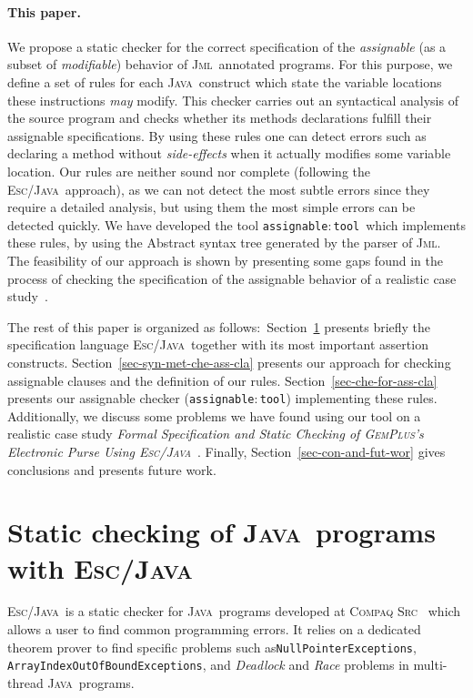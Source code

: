 \documentclass[a4paper]{llncs}
\newcommand{\jml}{\textsc{Jml}}
\newcommand{\escj}{\textsc{Esc/Java}}
\newcommand{\java}{\textsc{Java}}
\newcommand{\gplus}{\textsc{GemPlus}}
\newcommand{\csrc}{\textsc{Compaq Src}}
\newcommand{\modtool}{\texttt{assignable$:$tool}}
\begin{document}
\paragraph{\bf This paper.}We propose a static checker for the correct
specification of the
\emph{assignable} (as a subset of \emph{modifiable}) behavior of
\jml~annotated programs. For this purpose, we define a set
of rules for each \java~construct which state the variable locations
these instructions \emph{may} modify. This checker carries out an
syntactical analysis of the source program and checks whether its
methods declarations fulfill their assignable specifications. By using
these rules one can detect errors such as
declaring a method without \emph{side-effects} when it actually modifies 
some variable location. Our rules are neither sound nor complete
(following the \escj~approach), as we can not detect the most subtle
errors since they require a detailed analysis, but using them the
most simple errors can be detected quickly. We have developed the tool
\modtool~which implements these rules, by using the Abstract syntax
tree generated by the parser of \jml. The feasibility of our approach is
shown by presenting some gaps found in the process of checking the
specification of the
assignable behavior of a realistic case study~\cite{CatanoH02a}.


The rest of this paper is organized as follows$:$
Section~\ref{sec-esc-prg} presents briefly the specification language
\escj~together with its most important assertion
constructs. Section~\ref{sec-syn-met-che-ass-cla}
presents our approach for checking assignable clauses and the
definition of our rules. Section~\ref{sec-che-for-ass-cla}
presents our assignable checker (\modtool) implementing these
rules. Additionally, we discuss some problems we have found using our
tool on a realistic case study \emph{Formal Specification and Static
Checking of \gplus's Electronic Purse Using
\textsc{Esc/Java}}~\cite{CatanoH02a}. Finally,
Section~\ref{sec-con-and-fut-wor} gives conclusions and presents
future work.






\section{Static checking of \java~programs with \escj}
\label{sec-esc-prg}
\escj~is a static checker for \java~programs developed
at \csrc~\cite{ESCJavaUrl} which allows a user to find common
programming errors. It relies on a dedicated theorem prover to
find specific problems such as\texttt{NullPointerExceptions},
\texttt{ArrayIndexOutOfBoundExceptions},
 and \emph{Deadlock} and \emph{Race}
problems in multi-thread \java~programs.
\end{document}
